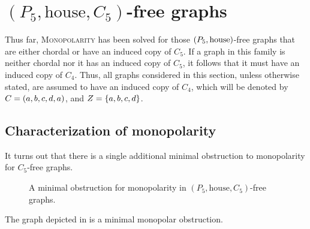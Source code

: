 \chapter{\texorpdfstring{$(P_5,\text{house},C_5)$}{(P5,house,C5)}-free graphs}
\label{cap:no_c5}

Thus far, \textsc{Monopolarity} has been solved for those
$\left(P_5,\text{house}\right)$-free graphs that are either chordal or have an induced
copy of $C_5$. If a graph in this family is neither chordal nor it has an
induced copy of $C_5$, it follows that it must have an induced copy of $C_4$.
Thus, all graphs considered in this section, unless otherwise stated, are
assumed to have an induced copy of $C_4$, which will be denoted by
$C=\left(a,b,c,d,a\right)$, and $Z=\left\{a,b,c,d\right\}$.

\section{Characterization of monopolarity}
\label{sec:no_c5_characterization}

It turns out that there is a single additional minimal obstruction to
monopolarity for $C_5$-free graphs.

\begin{figure}[ht]
    \centering
    \caption{A minimal obstruction for monopolarity in
        $(P_5,\text{house},C_5)$-free graphs.}
    \label{fig:p5-house-obstruction-no-c5}
\end{figure}

\begin{proposition}
    \label{prop:minimal_obs_no_c5}
    The graph depicted in  is a minimal
    monopolar obstruction.
\end{proposition}


